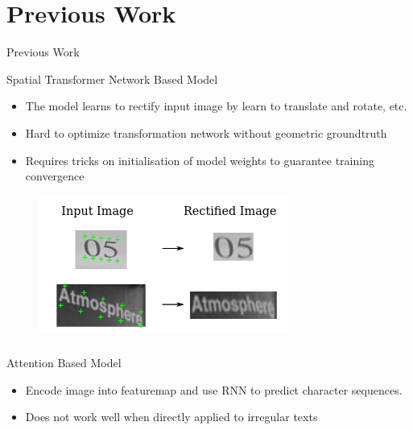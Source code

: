 \documentclass[compress]{beamer}
\begin{document}
\section{Previous Work}
\begin{frame}[allowframebreaks]{Previous Work}
    \begin{block}{Spatial Transformer Network Based Model}
        \begin{itemize}
            \item The model learns to rectify input image by learn to translate and rotate, etc.
            \item Hard to optimize transformation network without geometric groundtruth
            \item Requires tricks on initialisation of model weights to guarantee training convergence
        \end{itemize}
    \end{block}
    \begin{figure}
        \includegraphics[height=.5\textheight]{rectify}
    \end{figure}
    \framebreak
    \begin{columns}
        \begin{column}[T]{.5\textwidth}
            \begin{block}{Attention Based Model}
                \begin{itemize}
                    \item Encode image into featuremap and use RNN to predict character sequences.
                    \item Does not work well when directly applied to irregular texts
                \end{itemize}


\end{block}
\end{column}
\end{columns}
\end{frame}
\end{document}
